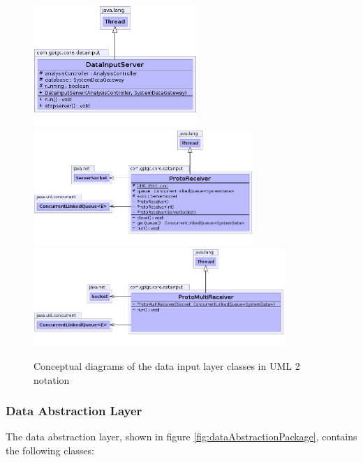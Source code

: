 \documentclass[10pt,a4paper]{article}
\begin{document}
\begin{figure}[h!]
  \centering
  \includegraphics[width=6.2cm]{images/DataInputLayer/DataInputServer.png}
  \includegraphics[width=8.3cm]{images/DataInputLayer/ProtoReceiver.png}
  \includegraphics[width=9.5cm]{images/DataInputLayer/ProtoMultiReceiver.png}
  \caption{Conceptual diagrams of the data input layer classes in 
UML 2 notation}
  \label{fig:dataInputLayer}
\end{figure}

\subsubsection*{Data Abstraction Layer} %

The data abstraction layer, shown in figure
\ref{fig:dataAbstractionPackage}, contains the following classes:
\end{document}
